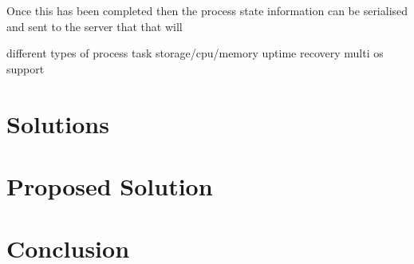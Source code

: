 \documentclass[12pt, a4paper]{article}
\begin{document}
Once this has been completed then the process state information can be
serialised and sent to the server that that will

different types of process task storage/cpu/memory
uptime
recovery
multi os support

\section{Solutions}

\section{Proposed Solution}

\section{Conclusion}
\end{document}
